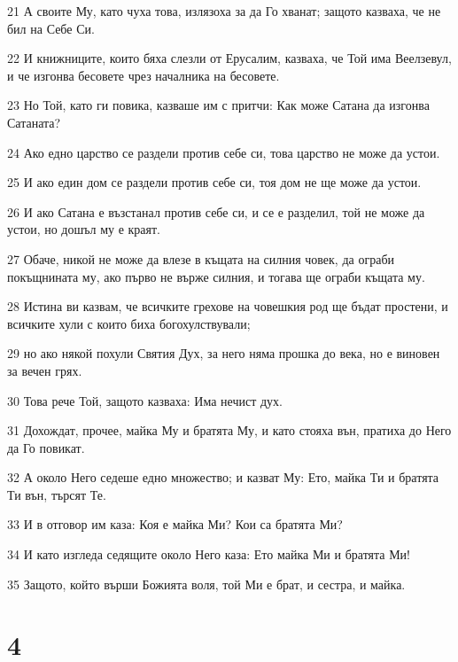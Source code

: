 \par 21 А своите Му, като чуха това, излязоха за да Го хванат; защото казваха, че не бил на Себе Си.
\par 22 И книжниците, които бяха слезли от Ерусалим, казваха, че Той има Веелзевул, и че изгонва бесовете чрез началника на бесовете.
\par 23 Но Той, като ги повика, казваше им с притчи: Как може Сатана да изгонва Сатаната?
\par 24 Ако едно царство се раздели против себе си, това царство не може да устои.
\par 25 И ако един дом се раздели против себе си, тоя дом не ще може да устои.
\par 26 И ако Сатана е възстанал против себе си, и се е разделил, той не може да устои, но дошъл му е краят.
\par 27 Обаче, никой не може да влезе в къщата на силния човек, да ограби покъщнината му, ако първо не върже силния, и тогава ще ограби къщата му.
\par 28 Истина ви казвам, че всичките грехове на човешкия род ще бъдат простени, и всичките хули с които биха богохулствували;
\par 29 но ако някой похули Святия Дух, за него няма прошка до века, но е виновен за вечен грях.
\par 30 Това рече Той, защото казваха: Има нечист дух.
\par 31 Дохождат, прочее, майка Му и братята Му, и като стояха вън, пратиха до Него да Го повикат.
\par 32 А около Него седеше едно множество; и казват Му: Ето, майка Ти и братята Ти вън, търсят Те.
\par 33 И в отговор им каза: Коя е майка Ми? Кои са братята Ми?
\par 34 И като изгледа седящите около Него каза: Ето майка Ми и братята Ми!
\par 35 Защото, който върши Божията воля, той Ми е брат, и сестра, и майка.

\chapter{4}

